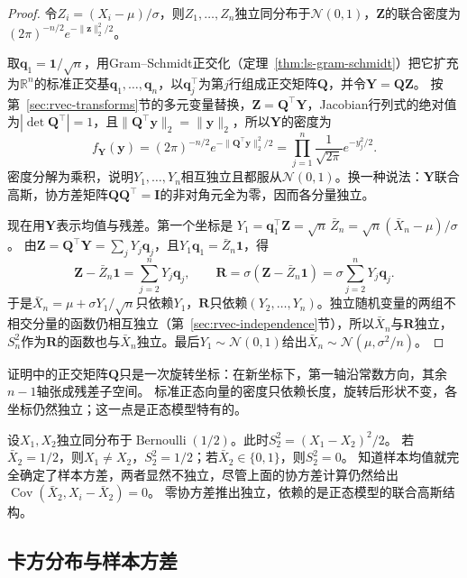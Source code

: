 \begin{proof}
令$Z_i=(X_i-\mu)/\sigma$，则$Z_1,\dots,Z_n$独立同分布于$\mathcal N(0,1)$，$\bm Z$的联合密度为$(2\pi)^{-n/2}e^{-\lVert\bm z\rVert_2^2/2}$。

取$\bm q_1=\bm 1/\sqrt n$，用Gram--Schmidt正交化（定理~\ref{thm:ls-gram-schmidt}）把它扩充为$\mathbb{R}^n$的标准正交基$\bm q_1,\dots,\bm q_n$，以$\bm q_j^\top$为第$j$行组成正交矩阵$\bm Q$，并令$\bm Y=\bm Q\bm Z$。
按第~\ref{sec:rvec-transforms}节的多元变量替换，$\bm Z=\bm Q^\top\bm Y$，Jacobian行列式的绝对值为$|\det\bm Q^\top|=1$，且$\lVert\bm Q^\top\bm y\rVert_2=\lVert\bm y\rVert_2$，所以$\bm Y$的密度为
\[
  f_{\bm Y}(\bm y)=(2\pi)^{-n/2}e^{-\lVert\bm Q^\top\bm y\rVert_2^2/2}=\prod_{j=1}^n\frac1{\sqrt{2\pi}}e^{-y_j^2/2}.
\]
密度分解为乘积，说明$Y_1,\dots,Y_n$相互独立且都服从$\mathcal N(0,1)$。换一种说法：$\bm Y$联合高斯，协方差矩阵$\bm Q\bm Q^\top=\bm I$的非对角元全为零，因而各分量独立。

现在用$\bm Y$表示均值与残差。第一个坐标是
$Y_1=\bm q_1^\top\bm Z=\sqrt n\,\bar Z_n=\sqrt n(\bar X_n-\mu)/\sigma$。
由$\bm Z=\bm Q^\top\bm Y=\sum_jY_j\bm q_j$，且$Y_1\bm q_1=\bar Z_n\bm 1$，得
\[
  \bm Z-\bar Z_n\bm 1=\sum_{j=2}^nY_j\bm q_j,\qquad
  \bm R=\sigma(\bm Z-\bar Z_n\bm 1)=\sigma\sum_{j=2}^nY_j\bm q_j.
\]
于是$\bar X_n=\mu+\sigma Y_1/\sqrt n$只依赖$Y_1$，$\bm R$只依赖$(Y_2,\dots,Y_n)$。独立随机变量的两组不相交分量的函数仍相互独立（第~\ref{sec:rvec-independence}节），所以$\bar X_n$与$\bm R$独立，$S_n^2$作为$\bm R$的函数也与$\bar X_n$独立。最后$Y_1\sim\mathcal N(0,1)$给出$\bar X_n\sim\mathcal N(\mu,\sigma^2/n)$。
\end{proof}

证明中的正交矩阵$\bm Q$只是一次旋转坐标：在新坐标下，第一轴沿常数方向，其余$n-1$轴张成残差子空间。
标准正态向量的密度只依赖长度，旋转后形状不变，各坐标仍然独立；这一点是正态模型特有的。

\begin{example}[非正态总体中均值与方差不独立]
\label{ex:samp-bernoulli-mean-variance-dependent}
设$X_1,X_2$独立同分布于$\operatorname{Bernoulli}(1/2)$。此时$S_2^2=(X_1-X_2)^2/2$。
若$\bar X_2=1/2$，则$X_1\ne X_2$，$S_2^2=1/2$；若$\bar X_2\in\{0,1\}$，则$S_2^2=0$。
知道样本均值就完全确定了样本方差，两者显然不独立，尽管上面的协方差计算仍然给出$\operatorname{Cov}(\bar X_2,X_i-\bar X_2)=0$。
零协方差推出独立，依赖的是正态模型的联合高斯结构。
\end{example}

\subsection{卡方分布与样本方差}
\label{sec:samp-chi-square}

